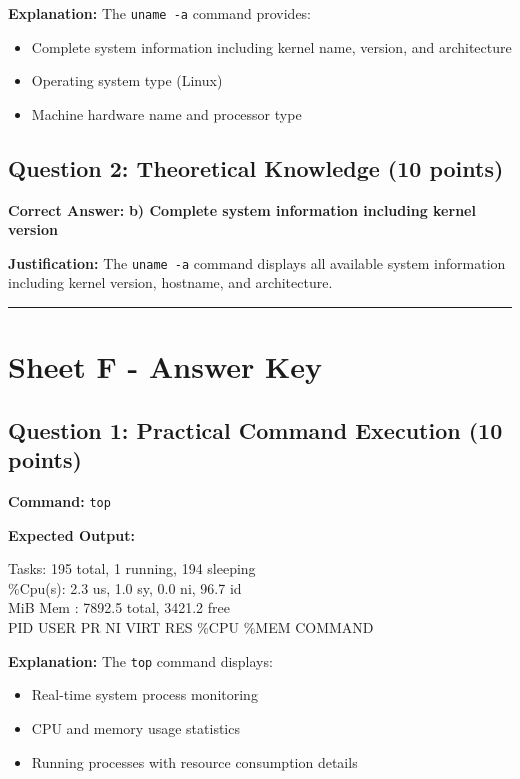 \documentclass[a4paper,11pt]{article}
\begin{document}
\textbf{Explanation:} The \texttt{uname -a} command provides:
\begin{itemize}[leftmargin=*,itemsep=2pt]
    \item Complete system information including kernel name, version, and architecture
    \item Operating system type (Linux)
    \item Machine hardware name and processor type
\end{itemize}

\subsection*{Question 2: Theoretical Knowledge (10 points)}

\textbf{Correct Answer:} \textcolor{successgreen}{\textbf{b) Complete system information including kernel version}}

\textbf{Justification:} The \texttt{uname -a} command displays all available system information including kernel version, hostname, and architecture.

\vspace{3mm}
\noindent\rule{\textwidth}{0.5pt}
\vspace{3mm}

\section*{Sheet F - Answer Key}

\subsection*{Question 1: Practical Command Execution (10 points)}

\textbf{Command:} \texttt{top}

\textbf{Expected Output:}
\begin{tcolorbox}[colback=lightgray,colframe=primaryblue,boxrule=0.5pt]
\ttfamily\footnotesize
Tasks: 195 total,   1 running, 194 sleeping\\
\%Cpu(s):  2.3 us,  1.0 sy,  0.0 ni, 96.7 id\\
MiB Mem :   7892.5 total,   3421.2 free\\
PID USER      PR  NI    VIRT    RES  \%CPU  \%MEM COMMAND
\end{tcolorbox}

\textbf{Explanation:} The \texttt{top} command displays:
\begin{itemize}[leftmargin=*,itemsep=2pt]
    \item Real-time system process monitoring
    \item CPU and memory usage statistics
    \item Running processes with resource consumption details
\end{itemize}
\end{document}
